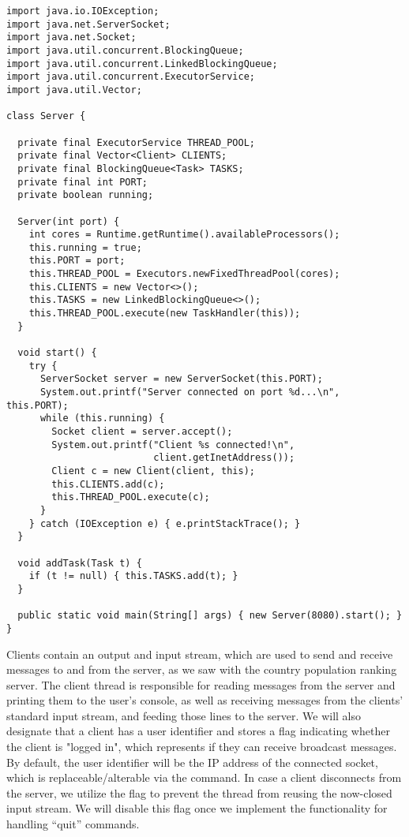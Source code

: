 \begin{lstlisting}[language=MyJava]
import java.io.IOException;
import java.net.ServerSocket;
import java.net.Socket;
import java.util.concurrent.BlockingQueue;
import java.util.concurrent.LinkedBlockingQueue;
import java.util.concurrent.ExecutorService;
import java.util.Vector;

class Server {

  private final ExecutorService THREAD_POOL;
  private final Vector<Client> CLIENTS;
  private final BlockingQueue<Task> TASKS;
  private final int PORT;
  private boolean running;

  Server(int port) {
    int cores = Runtime.getRuntime().availableProcessors();
    this.running = true;
    this.PORT = port;
    this.THREAD_POOL = Executors.newFixedThreadPool(cores);
    this.CLIENTS = new Vector<>();
    this.TASKS = new LinkedBlockingQueue<>();
    this.THREAD_POOL.execute(new TaskHandler(this));
  }

  void start() {
    try {
      ServerSocket server = new ServerSocket(this.PORT);
      System.out.printf("Server connected on port %d...\n", this.PORT);
      while (this.running) {
        Socket client = server.accept();
        System.out.printf("Client %s connected!\n", 
                          client.getInetAddress());
        Client c = new Client(client, this);
        this.CLIENTS.add(c);
        this.THREAD_POOL.execute(c);
      }
    } catch (IOException e) { e.printStackTrace(); }
  }

  void addTask(Task t) {
    if (t != null) { this.TASKS.add(t); }
  }

  public static void main(String[] args) { new Server(8080).start(); }
}
\end{lstlisting}

Clients contain an output and input stream, which are used to send and receive messages to and from the server, as we saw with the country population ranking server. 
The client thread is responsible for reading messages from the server and printing them to the user's console, as well as receiving messages from the clients' standard input stream, and feeding those lines to the server. 
We will also designate that a client has a user identifier and stores a flag indicating whether the client is "logged in", which represents if they can receive broadcast messages. 
By default, the user identifier will be the IP address of the connected socket, which is replaceable/alterable via the  command. 
In case a client disconnects from the server, we utilize the  flag to prevent the thread from reusing the now-closed input stream. 
We will disable this flag once we implement the functionality for handling ``quit'' commands.

